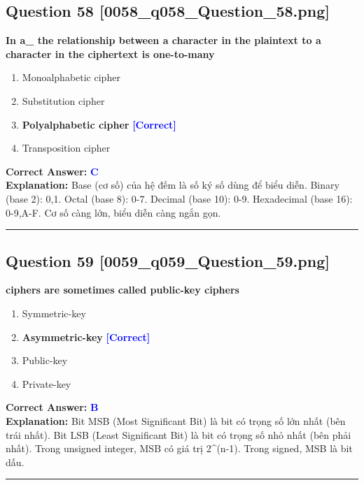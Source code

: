 \documentclass[11pt,a4paper]{article}
\begin{document}
\begin{minipage}{\textwidth}
\subsection*{Question 58 \quad \footnotesize{[0058\_q058\_Question\_58.png]}}
\noindent \textbf{In a\_ the relationship between a character in the plaintext to a character in the ciphertext is one-to-many}

\begin{enumerate}[label=\Alph*.]
    \item Monoalphabetic cipher
    \item Substitution cipher
    \item \textbf{Polyalphabetic cipher} \hfill \textcolor{blue}{\textbf{[Correct]}}
    \item Transposition cipher
\end{enumerate}

\noindent \textbf{Correct Answer:} \textcolor{blue}{\textbf{C}} \\[2pt]
\noindent \textbf{Explanation:} Base (cơ số) của hệ đếm là số ký số dùng để biểu diễn. Binary (base 2): 0,1. Octal (base 8): 0-7. Decimal (base 10): 0-9. Hexadecimal (base 16): 0-9,A-F. Cơ số càng lớn, biểu diễn càng ngắn gọn.

\par\vspace{0.3cm}
\hrule
\vspace{0.3cm}
\end{minipage}

\begin{minipage}{\textwidth}
\subsection*{Question 59 \quad \footnotesize{[0059\_q059\_Question\_59.png]}}
\noindent \textbf{ciphers are sometimes called public-key ciphers}

\begin{enumerate}[label=\Alph*.]
    \item Symmetric-key
    \item \textbf{Asymmetric-key} \hfill \textcolor{blue}{\textbf{[Correct]}}
    \item Public-key
    \item Private-key
\end{enumerate}

\noindent \textbf{Correct Answer:} \textcolor{blue}{\textbf{B}} \\[2pt]
\noindent \textbf{Explanation:} Bit MSB (Most Significant Bit) là bit có trọng số lớn nhất (bên trái nhất). Bit LSB (Least Significant Bit) là bit có trọng số nhỏ nhất (bên phải nhất). Trong unsigned integer, MSB có giá trị 2\textasciicircum{}(n-1). Trong signed, MSB là bit dấu.

\par\vspace{0.3cm}
\hrule
\vspace{0.3cm}
\end{minipage}
\end{document}
